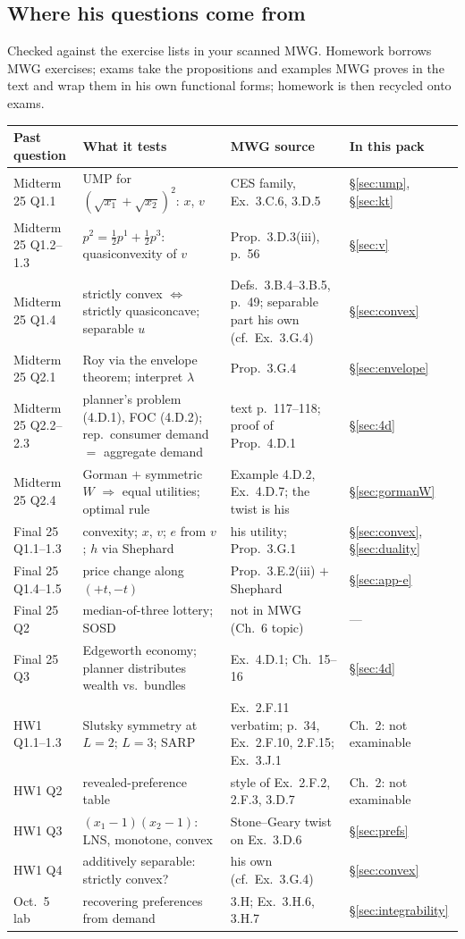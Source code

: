 \documentclass[11pt]{article}
\begin{document}
\subsection*{Where his questions come from}
Checked against the exercise lists in your scanned MWG. Homework borrows MWG exercises; exams take the propositions and examples MWG proves in the text and wrap them in his own functional forms; homework is then recycled onto exams.
\begin{center}\small
\begin{tabular}{p{2.3cm}p{4.3cm}p{4.6cm}p{3.3cm}}
\toprule
Past question & What it tests & MWG source & In this pack\\
\midrule
Midterm 25 Q1.1 & UMP for $(\sqrt{x_1}+\sqrt{x_2})^2$: $x$, $v$ & CES family, Ex.~3.C.6, 3.D.5 & \S\ref{sec:ump}, \S\ref{sec:kt}\\
Midterm 25 Q1.2--1.3 & $p^2=\tfrac12p^1+\tfrac12p^3$: quasiconvexity of $v$ & Prop.~3.D.3(iii), p.~56 & \S\ref{sec:v}\\
Midterm 25 Q1.4 & strictly convex $\iff$ strictly quasiconcave; separable $u$ & Defs.\ 3.B.4--3.B.5, p.~49; separable part his own (cf.\ Ex.~3.G.4) & \S\ref{sec:convex}\\
Midterm 25 Q2.1 & Roy via the envelope theorem; interpret $\lambda$ & Prop.~3.G.4 & \S\ref{sec:envelope}\\
Midterm 25 Q2.2--2.3 & planner's problem (4.D.1), FOC (4.D.2); rep.\ consumer demand $=$ aggregate demand & text p.~117--118; proof of Prop.~4.D.1 & \S\ref{sec:4d}\\
Midterm 25 Q2.4 & Gorman $+$ symmetric $W$ $\Rightarrow$ equal utilities; optimal rule & Example 4.D.2, Ex.~4.D.7; the twist is his & \S\ref{sec:gormanW}\\
Final 25 Q1.1--1.3 & convexity; $x$, $v$; $e$ from $v$; $h$ via Shephard & his utility; Prop.~3.G.1 & \S\ref{sec:convex}, \S\ref{sec:duality}\\
Final 25 Q1.4--1.5 & price change along $(+t,-t)$ & Prop.~3.E.2(iii) $+$ Shephard & \S\ref{sec:app-e}\\
Final 25 Q2 & median-of-three lottery; SOSD & not in MWG (Ch.~6 topic) & ---\\
Final 25 Q3 & Edgeworth economy; planner distributes wealth vs.\ bundles & Ex.~4.D.1; Ch.~15--16 & \S\ref{sec:4d}\\
HW1 Q1.1--1.3 & Slutsky symmetry at $L=2$; $L=3$; SARP & Ex.~2.F.11 verbatim; p.~34, Ex.~2.F.10, 2.F.15; Ex.~3.J.1 & Ch.~2: not examinable\\
HW1 Q2 & revealed-preference table & style of Ex.~2.F.2, 2.F.3, 3.D.7 & Ch.~2: not examinable\\
HW1 Q3 & $(x_1-1)(x_2-1)$: LNS, monotone, convex & Stone--Geary twist on Ex.~3.D.6 & \S\ref{sec:prefs}\\
HW1 Q4 & additively separable: strictly convex? & his own (cf.\ Ex.~3.G.4) & \S\ref{sec:convex}\\
Oct.~5 lab & recovering preferences from demand & 3.H; Ex.~3.H.6, 3.H.7 & \S\ref{sec:integrability}\\
\bottomrule
\end{tabular}
\end{center}
\end{document}
